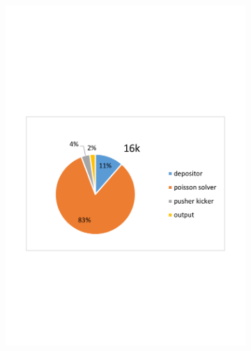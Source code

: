 \begin{figure}[!htb]
    \centering
    \begin{subfigure}[b]{0.75\textwidth}
        \includegraphics[width=\textwidth]{Img/PIC_speedup_1GPU_percentage1.pdf}
    \end{subfigure}
    \quad
    \begin{subfigure}[b]{0.75\textwidth}

\end{subfigure}
\end{figure}
